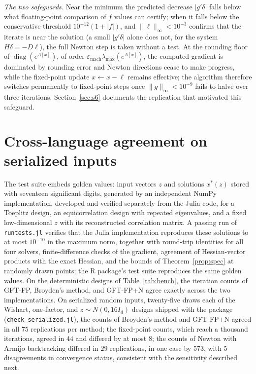 \documentclass[11pt]{article}
\newcommand{\diag}{\operatorname{diag}}
\begin{document}
\emph{The two safeguards.} Near the minimum the predicted decrease
$|g'\delta|$ falls below what floating-point comparison of $f$ values
can certify; when it falls below the conservative threshold
$10^{-12}(1+|f|)$, and $\|\ell\|_{\infty}<10^{-3}$ confirms that the
iterate is near the solution (a small $|g'\delta|$ alone does not,
for the system $H\delta=-D\ell$), the full Newton step is taken
without a test. At
the rounding floor of $\diag(e^{A[x]})$, of order
$\varepsilon_{\mathrm{mach}}\lambda_{\max}(e^{A[x]})$, the computed
gradient is dominated by rounding error and Newton directions cease to
make progress, while the fixed-point update $x\leftarrow x-\ell$
remains effective; the algorithm therefore switches permanently to
fixed-point steps once $\|g\|_{\infty}<10^{-9}$ fails to halve over
three iterations. Section~\ref{sec:s6} documents the replication that
motivated this safeguard.

\section{Cross-language agreement on serialized inputs}\label{sec:s3}

The test suite embeds golden values: input vectors $z$ and solutions
$x^{\ast}(z)$ stored with seventeen significant digits, generated by
an independent NumPy
implementation, developed and verified separately from the Julia code,
for a Toeplitz design, an equicorrelation design with repeated
eigenvalues, and a fixed low-dimensional $z$ with its reconstructed
correlation matrix. A passing run of \texttt{runtests.jl} verifies that
the Julia implementation reproduces these solutions to at most
$10^{-10}$ in the maximum norm, together with round-trip identities for
all four solvers, finite-difference checks of the gradient, agreement
of Hessian-vector products with the exact Hessian, and the bounds of
Theorem~\ref{prop:spec} at randomly drawn points; the R package's
test suite reproduces the same golden values. On the deterministic
designs of
Table~\ref{tab:bench}, the iteration counts of GFT-FP, Broyden's method,
and GFT-FP+N
agree exactly across the two implementations. On serialized random
inputs, twenty-five draws each of the Wishart, one-factor, and
$z\sim N(0,16I_d)$ designs shipped with the package
(\texttt{check\_serialized.jl}), the counts of Broyden's method and
GFT-FP+N agreed in all $75$ replications per method; the fixed-point
counts, which reach a thousand iterations, agreed in $44$ and
differed by at most $8$; the counts of Newton with Armijo
backtracking differed in $29$ replications, in one case by $573$, with $5$
disagreements in convergence status, consistent with the sensitivity
described next.
\end{document}
